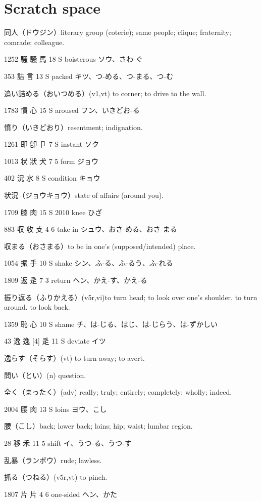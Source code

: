 \chapter{Scratch space}

同人（ドウジン）literary group (coterie); same people; clique; fraternity; comrade; colleague.

1252	騒	騷	馬	18	S		boisterous	ソウ、さわ-ぐ

353	詰		言	13	S		packed	キツ、つ-める、つ-まる、つ-む

追い詰める（おいつめる）(v1,vt) to corner; to drive to the wall.

1783	憤		心	15	S		aroused	フン、いきどお-る

憤り（いきどおり）resentment; indignation.

1261	即	卽	卩	7	S		instant	ソク

1013	状	狀	犬	7	5		form	ジョウ

402	況		水	8	S		condition	キョウ

状況（ジョウキョウ）state of affairs (around you).

1709	膝		肉	15	S	2010	knee	ひざ

883	収	收	攴	4	6		take in	シュウ、おさ-める、おさ-まる

収まる（おさまる）to be in one's (supposed/intended) place.

1054	振		手	10	S		shake	シン、ふ-る、ふ-るう、ふ-れる

1809	返		辵	7	3		return	ヘン、かえ-す、かえ-る

振り返る（ふりかえる）(v5r,vi)to turn head; to look over one's shoulder. to turn around. to look back.

1359	恥		心	10	S		shame	チ、は-じる、はじ、は-じらう、は-ずかしい

43	逸	逸 [4]	辵	11	S		deviate	イツ

逸らす（そらす）(vt) to turn away; to avert.

問い（とい）(n) question.

全く（まったく）(adv) really; truly; entirely; completely; wholly; indeed.

2004	腰		肉	13	S		loins	ヨウ、こし

腰（こし）back; lower back; loins; hip; waist; lumbar region.

28	移		禾	11	5		shift	イ、うつ-る、うつ-す

乱暴（ランボウ）rude; lawless.

抓る（つねる）(v5r,vt) to pinch.

1807	片		片	4	6		one-sided	ヘン、かた

